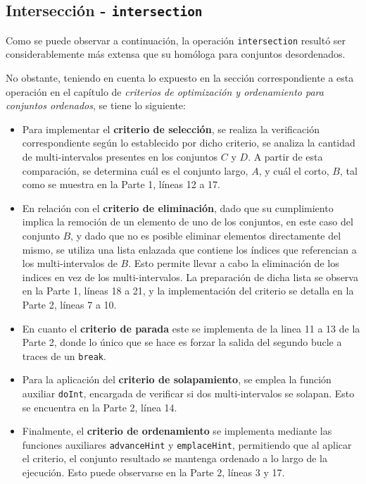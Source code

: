 \subsection{Intersección - \texttt{intersection}}
Como se puede observar a continuación, la operación \texttt{intersection} resultó ser considerablemente más extensa que su homóloga para conjuntos desordenados.

No obstante, teniendo en cuenta lo expuesto en la sección correspondiente a esta operación en el capítulo de \textit{criterios de optimización y ordenamiento para conjuntos ordenados}, se tiene lo siguiente:

\begin{itemize}
    \item Para implementar el \textbf{criterio de selección}, se realiza la verificación correspondiente según lo establecido por dicho criterio, se analiza la cantidad de multi-intervalos presentes en los conjuntos $C$ y $D$. A partir de esta comparación, se determina cuál es el conjunto largo, $A$, y cuál el corto, $B$, tal como se muestra en la Parte 1, líneas 12 a 17.

    \item En relación con el \textbf{criterio de eliminación}, dado que su cumplimiento implica la remoción de un elemento de uno de los conjuntos, en este caso del conjunto $B$, y dado que no es posible eliminar elementos directamente del mismo, se utiliza una lista enlazada que contiene los índices que referencian a los multi-intervalos de $B$. Esto permite llevar a cabo la eliminación de los indices en vez de los multi-intervalos. La preparación de dicha lista se observa en la Parte 1, líneas 18 a 21, y la implementación del criterio se detalla en la Parte 2, líneas 7 a 10.

    \item En cuanto el \textbf{criterio de parada} este se implementa de la linea 11 a 13 de la Parte 2, donde lo único que se hace es forzar la salida del segundo bucle a traces de un \texttt{break}.

    \item Para la aplicación del \textbf{criterio de solapamiento}, se emplea la función auxiliar \texttt{doInt}, encargada de verificar si dos multi-intervalos se solapan. Esto se encuentra en la Parte 2, línea 14.

    \item Finalmente, el \textbf{criterio de ordenamiento} se implementa mediante las funciones auxiliares \texttt{advanceHint} y \texttt{emplaceHint}, permitiendo que al aplicar el criterio, el conjunto resultado se mantenga ordenado a lo largo de la ejecución. Esto puede observarse en la Parte 2, líneas 3 y 17.
\end{itemize}

